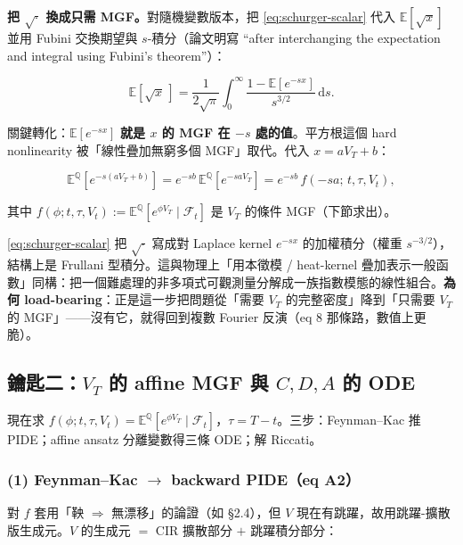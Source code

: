 \documentclass[12pt, a4paper]{article}
\theoremstyle{remark}
\newcommand{\E}{\mathbb{E}}
\newcommand{\Q}{\mathbb{Q}}
\newcommand{\dd}{\mathrm{d}}
\begin{document}
\textbf{把 $\sqrt{\cdot}$ 換成只需 MGF。}對隨機變數版本，把 \eqref{eq:schurger-scalar} 代入 $\E[\sqrt{x}]$ 並用 Fubini 交換期望與 $s$-積分（論文明寫 “after interchanging the expectation and integral using Fubini's theorem”）：

\begin{equation}
  \E\!\left[\sqrt{x}\,\right] = \frac{1}{2\sqrt\pi}\int_0^\infty \frac{1-\E[e^{-sx}]}{s^{3/2}}\,\dd s.
  \tag{A9}
\end{equation}

關鍵轉化：$\E[e^{-sx}]$ \textbf{就是 $x$ 的 MGF 在 $-s$ 處的值}。平方根這個 hard nonlinearity 被「線性疊加無窮多個 MGF」取代。代入 $x=aV_T+b$：

\begin{equation}
  \E^\Q\!\left[e^{-s(aV_T+b)}\right] = e^{-sb}\,\E^\Q\!\left[e^{-saV_T}\right] = e^{-sb}\,f(-sa;\,t,\tau,V_t),
  \tag{$\star$8}\label{eq:mgf-substitute}
\end{equation}

其中 $f(\phi;t,\tau,V_t):=\E^\Q[e^{\phi V_T}\mid\mathcal F_t]$ 是 $V_T$ 的條件 MGF（下節求出）。

\begin{physicsbox}[title={Laplace/Frullani 表示 $\equiv$ 用指數模態疊加非多項式可觀測量}]
\eqref{eq:schurger-scalar} 把 $\sqrt{\cdot}$ 寫成對 Laplace kernel $e^{-sx}$ 的加權積分（權重 $s^{-3/2}$），結構上是 Frullani 型積分。這與物理上「用本徵模 / heat-kernel 疊加表示一般函數」同構：把一個難處理的非多項式可觀測量分解成一族指數模態的線性組合。\textbf{為何 load-bearing}：正是這一步把問題從「需要 $V_T$ 的完整密度」降到「只需要 $V_T$ 的 MGF」——沒有它，就得回到複數 Fourier 反演（eq 8 那條路，數值上更脆）。
\end{physicsbox}

\subsection{鑰匙二：$V_T$ 的 affine MGF 與 $C,D,A$ 的 ODE}

現在求 $f(\phi;t,\tau,V_t)=\E^\Q[e^{\phi V_T}\mid\mathcal F_t]$，$\tau=T-t$。三步：Feynman--Kac 推 PIDE；affine ansatz 分離變數得三條 ODE；解 Riccati。

\subsubsection*{(1) Feynman--Kac $\to$ backward PIDE（eq A2）}

對 $f$ 套用「鞅 $\Rightarrow$ 無漂移」的論證（如 §2.4），但 $V$ 現在有跳躍，故用跳躍-擴散版生成元。$V$ 的生成元 $=$ CIR 擴散部分 $+$ 跳躍積分部分：
\end{document}
